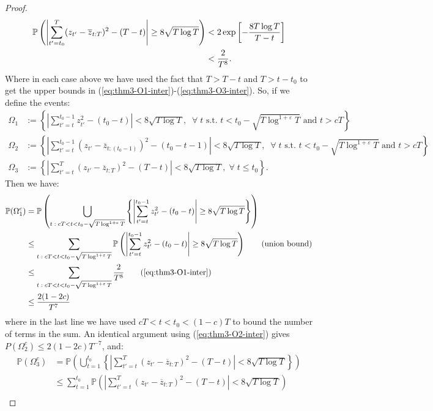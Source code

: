 \documentclass{article}
\newcommand{\sforall}{\;\forall\;}
\begin{document}
\begin{proof}
\begin{align}
    \mathbb{P}\left(\left|\sum_{t'=t_0}^T (z_{t'} - \overline{z}_{t:T})^2 - (T-t)\right| \geq 8\sqrt{T\log T}\right)&< 2 \exp\left[- \frac{8 T \log T}{T-t} \right]\notag \\
    &<  \frac{2}{T^8}. \label{eq:thm3-O3-inter}
\end{align}
Where in each case above we have used the fact that $T > T -t$ and $T > t - t_0$ to get the upper bounds in (\ref{eq:thm3-O1-inter})-(\ref{eq:thm3-O3-inter}). So, if we define the events:
\begin{align*}
    \Omega_1 &:= \left\{\left|\sum_{t'=t}^{t_0-1} z^2_{t'} - (t_0 - t)\right| < 8\sqrt{T \log T}, \; \sforall t \text{ s.t. } t < t_0 - \sqrt{T\log^{1+\varepsilon}T} \text{ and } t > cT\right\} \\
    \Omega_2 &:= \left\{\left|\sum_{t'=t}^{t_0-1} (z_{t'} - \overline{z}_{t:(t_0-1)})^2- (t_0 -t - 1)\right| < 8\sqrt{T \log T}, \; \sforall t \text{ s.t. } t < t_0 - \sqrt{T\log^{1+\varepsilon}T} \text{ and } t > cT\right\} \\
    \Omega_3 &:= \left\{\left|\sum_{t'=t}^T (z_{t'} - \overline{z}_{t:T})^2 - (T-t)\right| < 8\sqrt{T \log T}, \sforall t \leq t_0\right\}.
\end{align*}
Then we have:
\begin{align*}
    \mathbb{P}(\Omega^c_1) &= \mathbb{P}\left(\bigcup_{t\;:\; cT < t < t_0 - \sqrt{T\log^{1+\varepsilon}T}} \left\{\left|\sum_{t'=t}^{t_0-1} z^2_{t'} - (t_0 -t)\right| \geq 8\sqrt{T \log T}\right\}\right) \\
    &\leq \sum_{t\;:\; cT < t < t_0 - \sqrt{T\log^{1+\varepsilon}T}} \mathbb{P}\left(\left|\sum_{t'=t}^{t_0-1} z^2_{t'} - (t_0 -t)\right| \geq 8\sqrt{T \log T}\right) \tag{union bound}\\
    &\leq \sum_{t\;:\; cT < t < t_0 - \sqrt{T\log^{1+\varepsilon}T}} \frac{2}{T^8} \tag{\ref{eq:thm3-O1-inter}} \\
    &\leq \frac{2(1-2c)}{T^7}
\end{align*}
where in the last line we have used $cT< t < t_0 <(1-c)T$ to bound the number of terms in the sum. An identical argument using (\ref{eq:thm3-O2-inter}) gives $P(\Omega_2^c) \leq 2(1-2c)T^{-7}$, and:
\begin{align*}
    \mathbb{P}(\Omega^c_3) &= \mathbb{P}\left(\bigcup_{t=1}^{t_0} \left\{\left|\sum_{t'=t}^T (z_{t'} - \overline{z}_{t:T})^2 - (T-t)\right| < 8\sqrt{T \log T}\right\}\right) \\
    &\leq \sum_{t=1}^{t_0} \mathbb{P}\left(\left|\sum_{t'=t}^T (z_{t'} - \overline{z}_{t:T})^2 - (T-t)\right| < 8\sqrt{T \log T}\right) \tag{union bound}\\

\end{align*}
\end{proof}
\end{document}
